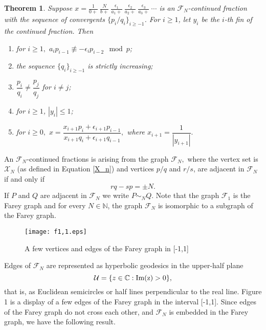 \documentclass[12pt]{elsarticle}
\newtheorem{theorem}{Theorem}[section]
\theoremstyle{definition}
\newcommand{\field}[1]{\mathbb{#1}}          \newcommand{\Q}{\field{Q}}
\newcommand{\N}{\field{N}}
\newcommand{\C}{\field{C}}                   \newcommand{\A}{\field{A}}
\newcommand{\im}{\rm Im}
\newcommand{\f}{{\mathcal F}}
\newcommand{\ep}{\epsilon}
\begin{document}
	\begin{theorem}\cite[Theorem 3.2]{seemafnpart1}\label{distinctconvergents}
		Suppose $x= \frac{1}{0+}~\frac{N}{b+}~ \frac{\ep_1}{a_1 +}~ \frac{\ep_2}{a_2 +}~ \frac{\ep_3}{a_3 +}~\cdots
		$ is an $\f_N$-continued fraction with the sequence of convergents $\{p_i/q_i\}_{i\ge -1}$. For $i\ge1$, let  
		$y_i$ be the $i$-th \it{fin} of the continued fraction.  Then
		\begin{enumerate}
			\item 	for  $i\ge1,$ $a_ip_{i-1}\not \equiv -\ep_{i}p_{i-2}\mod p$;
			\item 	the sequence $\{q_i\}_{i\ge -1}$ is strictly increasing;
			\item $\dfrac{p_i}{q_i}\ne \dfrac{p_j}{q_j}$ for $i\ne j$;
			\item for $i\ge1$, $|y_i|\le1$;
			\item for $i\ge0,$ $x=\dfrac{x_{i+1}p_i+\ep_{i+1}p_{i-1}}{x_{i+1}q_i+\ep_{i+1}q_{i-1}},$ where $x_{i+1}=\dfrac{1}{|y_{i+1}|}.$
		\end{enumerate}
	\end{theorem}
	
	 An $\f_N$-continued fractions is arising from the graph $\f_N,$ where
 the  vertex set is  $\mathcal{X}_N$ (as defined in Equation \eqref{X_n})  and vertices ${p}/{q}$ and ${r}/{s}$, are adjacent in $\mathcal{F}_N$ if and only if  $$rq-sp=\pm N.$$ 
		If $P$ and $Q$ are adjacent in $\f_N$ we write $P\sim_N Q$. Note that the graph $\f_{1}$ is the Farey graph 
and for every $N\in\N$, the graph $\f_N$ is isomorphic to a subgraph of the Farey graph.


	 \begin{figure}[!h]
	 	\centering
	 	\texttt{[image: f1,1.eps]}
	 	\caption{A few vertices and edges of the Farey graph in [-1,1]}\label{Fig:farey}
	 \end{figure}
	\noindent Edges of $\f_{N}$ are represented as hyperbolic geodesics in the upper-half plane $$\mathcal{U}=\{z\in\C: \im(z)>0\},$$
	that is, as Euclidean semicircles or half lines perpendicular to the real line. Figure 1 is a display of a few edges of the Farey graph in the interval [-1,1].
Since edges of the Farey graph do not cross each other, and $\f_N$ is embedded in the Farey graph, we have the following result.
	
\end{document}
